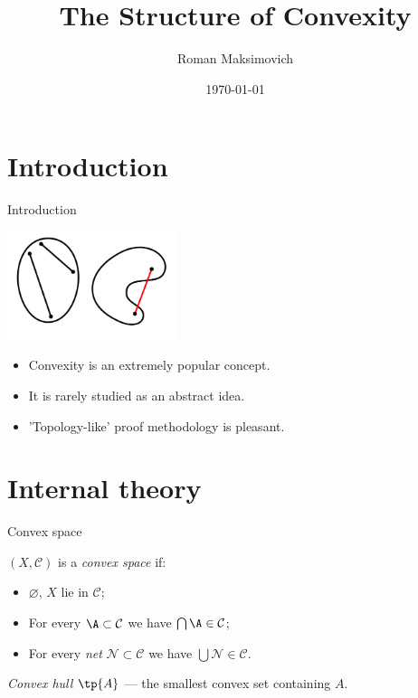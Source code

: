 \documentclass[12pt]{beamer}
\title[The Structure of Convexity]
	{\bfseries \LARGE The Structure of Convexity}
\author[Roman Maksimovich]{Roman Maksimovich}
\institute{Belgrade, Serbia}
\date{\today}
\newcommand{\C}{\EuScript{C}}
\renewcommand{\C}{\mathcal{C}}
\renewcommand{\N}{\mathcal{N}}
\begin{document}
\begin{frame}\titlepage\end{frame}

\newpage

\section*{Introduction}

\begin{frame}{Introduction}


    \centering

    \includegraphics[width = 5cm]{1.png}


    \begin{itemize}
        \item Convexity is an extremely popular concept.
        \item It is rarely studied as an abstract idea.
        \item 'Topology-like' proof methodology is pleasant.
    \end{itemize}

\end{frame}

\newpage

\section*{Internal theory}

\begin{frame}{Convex space}
    \begin{definition}
        \((X, \C)\) is a \textit{convex space} if:

        \begin{itemize}
            \item \(\varnothing\), \(X\) lie in \(\C\);
            \item For every \(\A \subset \C\) we have \(\bigcap \A \in \C\);
            \item For every \textit{net} \(\N \subset \C\) we have \(\bigcup \N \in \C\).  
        \end{itemize}
    \end{definition}

    \begin{definition}
        \textit{Convex hull} \(\tp{A}\) --- the smallest convex set containing \(A\).
    \end{definition}
\end{frame}
\end{document}
